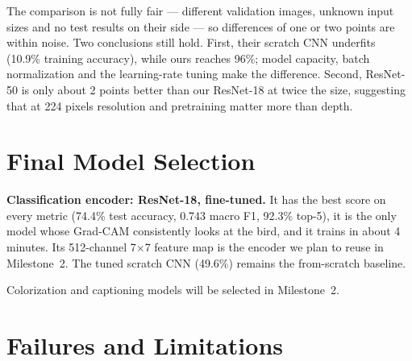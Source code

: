 \documentclass[11pt,a4paper]{article}
\begin{document}
The comparison is not fully fair --- different validation images, unknown
input sizes and no test results on their side --- so differences of one or two
points are within noise. Two conclusions still hold. First, their scratch CNN
underfits (10.9\% training accuracy), while ours reaches 96\%; model capacity,
batch normalization and the learning-rate tuning make the difference. Second,
ResNet-50 is only about 2 points better than our ResNet-18 at twice the size,
suggesting that at 224 pixels resolution and pretraining matter more than
depth.

\section{Final Model Selection}

\textbf{Classification encoder: ResNet-18, fine-tuned.} It has the best score on
every metric (74.4\% test accuracy, 0.743 macro F1, 92.3\% top-5), it is the
only model whose Grad-CAM consistently looks at the bird, and it trains in
about 4 minutes. Its 512-channel 7$\times$7 feature map is the encoder we plan
to reuse in Milestone~2. The tuned scratch CNN (49.6\%) remains the
from-scratch baseline.

Colorization and captioning models will be selected in Milestone~2.

\section{Failures and Limitations}
\end{document}
